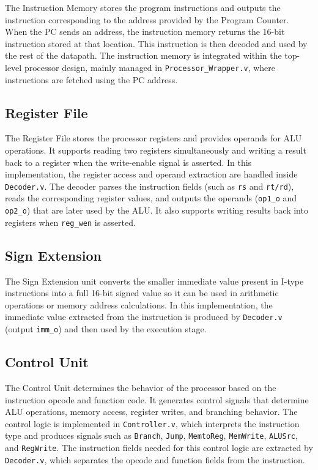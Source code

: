 \documentclass{article}
\begin{document}
The Instruction Memory stores the program instructions and outputs the instruction corresponding to the address provided by the Program Counter. When the PC sends an address, the instruction memory returns the 16-bit instruction stored at that location. This instruction is then decoded and used by the rest of the datapath. The instruction memory is integrated within the top-level processor design, mainly managed in \texttt{Processor\_Wrapper.v}, where instructions are fetched using the PC address.

\subsection{Register File}

The Register File stores the processor registers and provides operands for ALU operations. It supports reading two registers simultaneously and writing a result back to a register when the write-enable signal is asserted. In this implementation, the register access and operand extraction are handled inside \texttt{Decoder.v}. The decoder parses the instruction fields (such as \texttt{rs} and \texttt{rt/rd}), reads the corresponding register values, and outputs the operands (\texttt{op1\_o} and \texttt{op2\_o}) that are later used by the ALU. It also supports writing results back into registers when \texttt{reg\_wen} is asserted.


\subsection{Sign Extension}

The Sign Extension unit converts the smaller immediate value present in I-type instructions into a full 16-bit signed value so it can be used in arithmetic operations or memory address calculations. In this implementation, the immediate value extracted from the instruction is produced by \texttt{Decoder.v} (output \texttt{imm\_o}) and then used by the execution stage.


\subsection{Control Unit}
The Control Unit determines the behavior of the processor based on the instruction opcode and function code. It generates control signals that determine ALU operations, memory access, register writes, and branching behavior. The control logic is implemented in \texttt{Controller.v}, which interprets the instruction type and produces signals such as \texttt{Branch}, \texttt{Jump}, \texttt{MemtoReg}, \texttt{MemWrite}, \texttt{ALUSrc}, and \texttt{RegWrite}. The instruction fields needed for this control logic are extracted by \texttt{Decoder.v}, which separates the opcode and function fields from the instruction.
\end{document}
